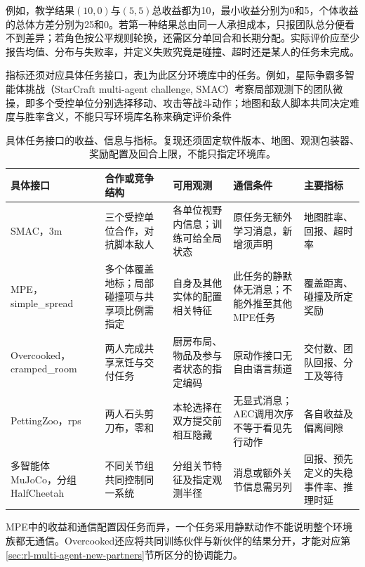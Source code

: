 例如，教学结果$(10,0)$与$(5,5)$总收益都为10，最小收益分别为0和5，个体收益的总体方差分别为25和0。若第一种结果总由同一人承担成本，只报团队总分便看不到差异；若角色按公平规则轮换，还需区分单回合和长期分配。实际评价应至少报告均值、分布与失败率，并定义失败究竟是碰撞、超时还是某人的任务未完成。

指标还须对应具体任务接口，表\ref{tab:rl-multi-agent-benchmarks}为此区分环境库中的任务。例如，星际争霸多智能体挑战（StarCraft multi-agent challenge, SMAC）考察局部观测下的团队微操，即多个受控单位分别选择移动、攻击等战斗动作；地图和敌人脚本共同决定难度与胜率含义，不能只写环境库名称来确定评价条件

\begin{table}[t]
 \centering
 \begin{tabularx}{\linewidth}{@{}l >{\raggedright\arraybackslash}X >{\raggedright\arraybackslash}X >{\raggedright\arraybackslash}X >{\raggedright\arraybackslash}X@{}}
 \toprule
 具体接口 & 合作或竞争结构 & 可用观测 & 通信条件 & 主要指标\\
 \midrule
 SMAC，3m & 三个受控单位合作，对抗脚本敌人 & 各单位视野内信息；训练可给全局状态 & 原任务无额外学习消息，新增须声明 & 地图胜率、回报、超时率\\
 MPE，simple\_spread & 多个体覆盖地标；局部碰撞项与共享项比例需指定 & 自身及其他实体的配置相关特征 & 此任务的静默体无消息；不能外推至其他MPE任务 & 覆盖距离、碰撞及所定奖励\\
 Overcooked，cramped\_room & 两人完成共享烹饪与交付任务 & 厨房布局、物品及参与者状态的指定编码 & 原动作接口无自由语言频道 & 交付数、团队回报、分工及等待\\
 PettingZoo，rps & 两人石头剪刀布，零和 & 本轮选择在双方提交前相互隐藏 & 无显式消息；AEC调用次序不等于看见先行动作 & 各自收益及偏离间隙\\
 多智能体MuJoCo，分组HalfCheetah & 不同关节组共同控制同一系统 & 分组关节特征及指定观测半径 & 消息或额外关节信息需另列 & 回报、预先定义的失稳事件率、推理时延\\
 \bottomrule
 \end{tabularx}
 \caption{具体任务接口的收益、信息与指标。复现还须固定软件版本、地图、观测包装器、奖励配置及回合上限，不能只指定环境库。}
 \label{tab:rl-multi-agent-benchmarks}
\end{table}

MPE中的收益和通信配置因任务而异，一个任务采用静默动作不能说明整个环境族都无通信。Overcooked还应将共同训练伙伴与新伙伴的结果分开，才能对应第\ref{sec:rl-multi-agent-new-partners}节所区分的协调能力。

